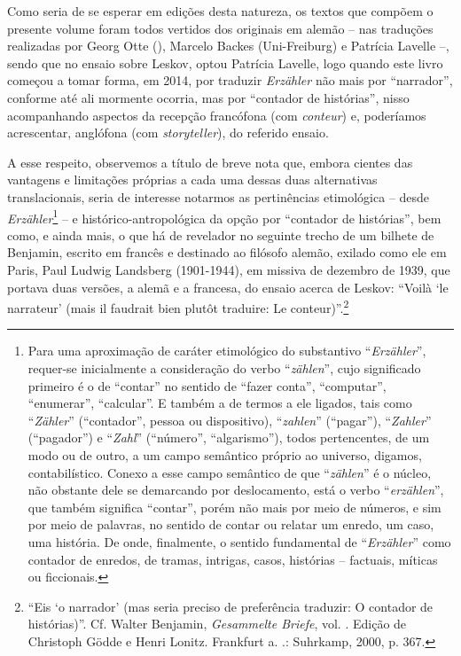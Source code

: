 
Como seria de se esperar em edições desta natureza, os textos que
compõem o presente volume foram todos vertidos dos originais em alemão
-- nas traduções realizadas por Georg Otte (), Marcelo Backes
(Uni-Freiburg) e Patrícia Lavelle --, sendo que no ensaio sobre
Leskov, optou Patrícia Lavelle, logo quando este livro começou a tomar
forma, em 2014, por traduzir \emph{Erzähler} não mais por ``narrador'',
conforme até ali mormente ocorria, mas por ``contador de histórias'',
nisso acompanhando aspectos da recepção francófona (com
\emph{conteur}) e, poderíamos acrescentar, anglófona (com
\emph{storyteller}), do referido ensaio.

A esse respeito, observemos a título de breve nota que, embora cientes
das vantagens e limitações próprias a cada uma dessas duas alternativas
translacionais, seria de interesse notarmos as pertinências etimológica
-- desde \emph{Erzähler}\footnote{Para uma aproximação de caráter
  etimológico do substantivo ``\emph{Erzähler}'', requer-se inicialmente
  a consideração do verbo ``\emph{zählen}'', cujo significado primeiro é
  o de ``contar'' no sentido de ``fazer conta'', ``computar'',
  ``enumerar'', ``calcular''. E também a de termos a ele ligados, tais
  como ``\emph{Zähler}'' (``contador'', pessoa ou dispositivo),
  ``\emph{zahlen}'' (``pagar''), ``\emph{Zahler}'' (``pagador'') e
  ``\emph{Zahl}'' (``número'', ``algarismo''), todos pertencentes, de um
  modo ou de outro, a um campo semântico próprio ao universo, digamos,
  contabilístico. Conexo a esse campo semântico de que ``\emph{zählen}''
  é o núcleo, não obstante dele se demarcando por deslocamento, está o
  verbo ``\emph{erzählen}'', que também significa ``contar'', porém não
  mais por meio de números, e sim por meio de palavras, no sentido de
  contar ou relatar um enredo, um caso, uma história. De onde,
  finalmente, o sentido fundamental de ``\emph{Erzähler}'' como contador
  de enredos, de tramas, intrigas, casos, histórias -- factuais, míticas
  ou ficcionais.} -- e histórico-antropológica da opção por ``contador
de histórias'', bem como, e ainda mais, o que há de revelador no
seguinte trecho de um bilhete de Benjamin, escrito em francês e
destinado ao filósofo alemão, exilado como ele em Paris, Paul Ludwig
Landsberg (1901-1944), em missiva de dezembro de 1939, que portava duas
versões, a alemã e a francesa, do ensaio acerca de Leskov: ``Voilà `le
narrateur' (mais il faudrait bien plutôt traduire: Le
conteur)''.\footnote{``Eis `o narrador' (mas seria preciso de
  preferência traduzir: O contador de histórias)''. Cf. Walter Benjamin,
  \emph{Gesammelte Briefe}, vol. . Edição de Christoph Gödde e Henri
  Lonitz. Frankfurt a. .: Suhrkamp, 2000, p. 367.}

